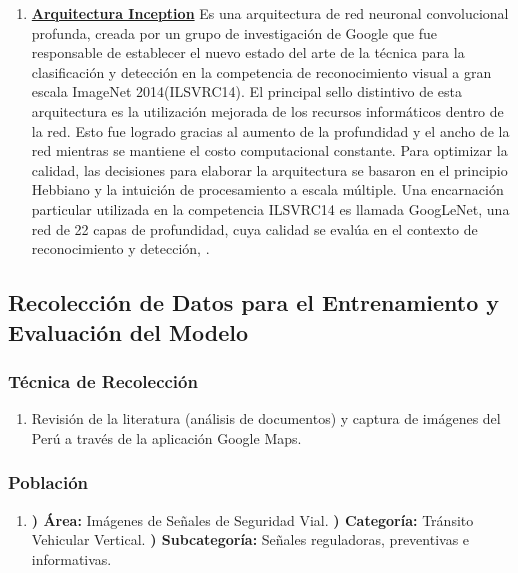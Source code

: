 		\begin{enumerate}
		\item[] {\bf \underline {Arquitectura Inception}}\newline
			Es una arquitectura de red neuronal convolucional profunda, creada por un grupo de investigación de Google que fue responsable de establecer el nuevo estado del arte de la técnica para la clasificación y detección en la competencia de reconocimiento visual a gran escala ImageNet 2014(ILSVRC14). 
			\vskip 0.1cm
			El principal sello distintivo de esta arquitectura es la utilización mejorada de los recursos informáticos dentro de la red. Esto fue logrado gracias al aumento de la profundidad y el ancho de la red mientras se mantiene el costo computacional constante. Para optimizar la calidad, las decisiones para elaborar la arquitectura se basaron en el principio Hebbiano y la intuición de procesamiento a escala múltiple. Una encarnación particular utilizada en la competencia ILSVRC14 es llamada GoogLeNet, una red de 22 capas de profundidad, cuya calidad se evalúa en el contexto de reconocimiento y detección, \citep{Inception}.
		\end{enumerate}

	\subsection{Recolección de Datos para el Entrenamiento y Evaluación del Modelo}
		
		\subsubsection{Técnica de Recolección}
		\begin{enumerate}		
			\item[]  Revisión de la literatura (análisis de documentos) y captura de imágenes del Perú a través de la aplicación Google Maps.
		\end{enumerate}

		\subsubsection{Población} 
		\begin{enumerate}
		\item[]				
		{\bf *) Área:} Imágenes de Señales de Seguridad Vial.\vskip 0.1cm
		{\bf *) Categoría:} Tránsito Vehicular Vertical.\vskip 0.1cm
		{\bf *) Subcategoría:} Señales reguladoras, preventivas e informativas.\vskip 0.1cm
		\end{enumerate}

